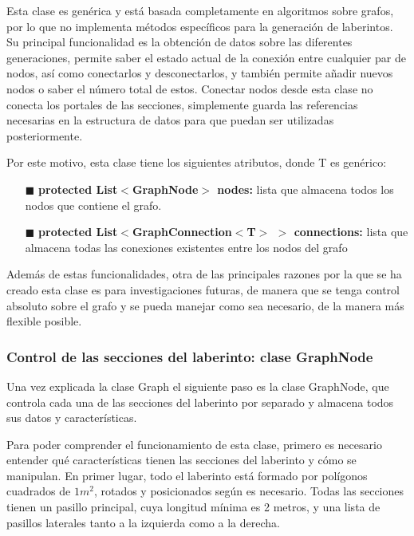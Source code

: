 \documentclass[../main.tex]{subfiles}
\begin{document}
Esta clase es genérica y está basada completamente en algoritmos sobre grafos, por lo que no implementa métodos específicos para la generación de laberintos. Su principal funcionalidad es la obtención de datos sobre las diferentes generaciones, permite saber el estado actual de la conexión entre cualquier par de nodos, así como conectarlos y desconectarlos, y también permite añadir nuevos nodos o saber el número total de estos. 
Conectar nodos desde esta clase no conecta los portales de las secciones, simplemente guarda las referencias necesarias en la estructura de datos para que puedan ser utilizadas posteriormente.

Por este motivo, esta clase tiene los siguientes atributos, donde T es genérico:

\begin{itemize}
    \item[$\blacksquare$] \textbf{protected List$<$GraphNode$>$ nodes:} lista que almacena todos los nodos que contiene el grafo.
    \item[$\blacksquare$] \textbf{protected List$<$GraphConnection$<$T$>$ $>$ connections:} lista que almacena todas las conexiones existentes entre los nodos del grafo
\end{itemize}

Además de estas funcionalidades, otra de las principales razones por la que se ha creado esta clase es para investigaciones futuras, de manera que se tenga control absoluto sobre el grafo y se pueda manejar como sea necesario, de la manera más flexible posible.

\subsubsection{Control de las secciones del laberinto: clase GraphNode}

Una vez explicada la clase Graph el siguiente paso es la clase GraphNode, que controla cada una de las secciones del laberinto por separado y almacena todos sus datos y características. 

Para poder comprender el funcionamiento de esta clase, primero es necesario entender qué características tienen las secciones del laberinto y cómo se manipulan. En primer lugar, todo el laberinto está formado por polígonos cuadrados de $1m^2$, rotados y posicionados según es necesario. Todas las secciones tienen un pasillo principal, cuya longitud mínima es 2 metros, y una lista de pasillos laterales tanto a la izquierda como a la derecha. 
\end{document}
